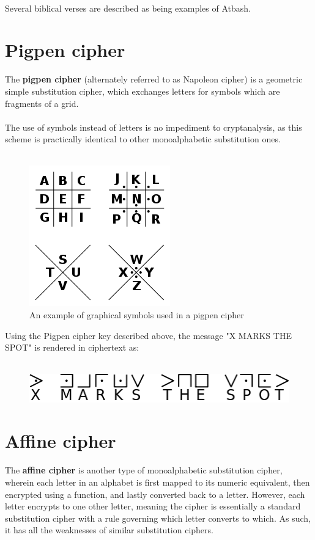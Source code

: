 \documentclass[Lau,binding=0.6cm,oneside]{sapthesis}
\begin{document}
\ \\
Several biblical verses are described as being examples of Atbash\supercite{atbash}.\\

\section{Pigpen cipher}
The \textbf{pigpen cipher} (alternately referred to as Napoleon cipher) is a geometric simple substitution cipher, which exchanges letters for symbols which are fragments of a grid.\\\\
The use of symbols instead of letters is no impediment to cryptanalysis, as this scheme is practically identical to other monoalphabetic substitution ones.\\\\

\begin{figure}[h]
\includegraphics[scale=0.4]{pigpen}
\centering
\caption{An example of graphical symbols used in a pigpen cipher}
\centering
\end{figure}

Using the Pigpen cipher key described above, the message "X MARKS THE SPOT" is rendered in ciphertext as:\\\\

\begin{figure}[h]
\includegraphics[scale=0.7]{xmarksthespot}
\centering
\caption{}
\centering
\end{figure}

\section{Affine cipher}
The \textbf{affine cipher} is another type of monoalphabetic substitution cipher, wherein each letter in an alphabet is first mapped to its numeric equivalent, then encrypted using a function, and lastly converted back to a letter. However, each letter encrypts to one other letter, meaning the cipher is essentially a standard substitution cipher with a rule governing which letter converts to which. As such, it has all the weaknesses of similar substitution ciphers\supercite{affine}.\\\\
\end{document}
